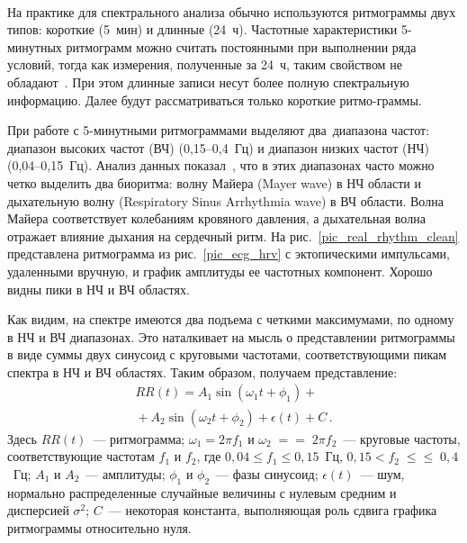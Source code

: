 \begin{multicols}{2}
\begin{figure*} %
\vspace*{1pt}
\begin{center}
\mbox{%
\epsfxsize=159.286mm
}
\end{center}
\vspace*{-9pt}
\end{figure*}

На практике для спектрального анализа  обычно используются
ритмограммы двух типов: короткие (5~мин) и длинные (24~ч).
Частотные характеристики 5-минутных ритмограмм можно считать
постоянными при выполнении ряда условий, тогда как измерения,
полученные за 24~ч, таким свойством не обладают~\cite{1ma}. При этом
длинные записи несут более полную спектральную информацию. Далее
будут рассматриваться только короткие ритмо-\linebreak граммы.

При работе с 5-минутными ритмограммами  выделяют два~диапазона
час\-тот: диапазон высоких час\-тот (ВЧ) (0,15--0,4~Гц) и диапазон
низких частот (НЧ) (0,04--0,15~Гц). Анализ данных показал~\cite{1ma, 2ma},
что в этих диапазонах часто можно четко выделить два биоритма:
волну Майера (Mayer wave) в НЧ области и дыхательную волну
(Respiratory Sinus Arrhythmia wave) в ВЧ области. Волна Майера
соответствует колебаниям кровяного давления, а дыхательная волна
отражает влияние дыхания на сердечный ритм.
На рис.~\ref{pic_real_rhythm_clean} представлена ритмограмма из
рис.~\ref{pic_ecg_hrv} с эктопическими импульсами, удаленными вручную,
и график амплитуды ее час\-тот\-ных компонент. Хорошо видны пики в НЧ
и ВЧ областях.

Как видим, на спектре имеются два подъема с четкими максимумами, по одному в 
НЧ и ВЧ диапазонах. Это наталкивает на мысль о пред\-став\-ле\-нии ритмограммы 
в виде суммы двух синусоид с круговыми частотами, соответствующими пикам спектра 
в НЧ и ВЧ областях. Таким образом, получаем представление:
\begin{multline}
\label{modelsin}
RR(t) = A_1\sin(\omega_1 t+\phi_1)+{}\\
{}+A_2\sin(\omega_2 t+\phi_2)+\epsilon(t)+C\,.
\end{multline}
Здесь
$RR(t)$~--- ритмограмма;
$\omega_1=2\pi f_1$ и $\omega_2\;=$\linebreak $=\;2\pi f_2$~--- круговые частоты, 
соответствующие час\-то\-там $f_1$ и $f_2$, где
    $0{,}04\leq f_1\leq 0{,}15$~Гц, $0{,}15 <f_2\;\leq$\linebreak $\leq\;0{,}4$~Гц;
 $A_1$ и $A_2$~--- амплитуды; $\phi_1$ и $\phi_2$~--- фазы синусоид;
 $\epsilon(t)$~--- шум, нормально распределенные случайные величины с нулевым средним и дисперсией $\sigma^2$;
 $C$~--- некоторая константа, выполняющая роль сдвига графика ритмограммы относительно нуля.


\end{multicols}
